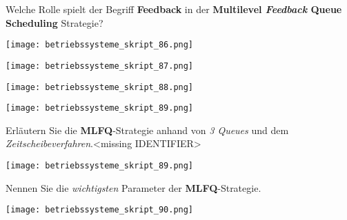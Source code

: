 \documentclass{article}
\begin{document}
\begin{tcolorbox}[colback=white!10!white,colframe=lightgray!75!black,
  savelowerto=\jobname_ex.tex,breakable,enhanced,lines before break=40]

\justifying
Welche Rolle spielt der Begriff \textbf{Feedback} in der \textbf{Multilevel \textit{Feedback} Queue Scheduling} Strategie?

\tcblower

\justifying
\begin{center}
\texttt{[image: betriebssysteme\_skript\_86.png]}
\end{center}
\begin{center}
\texttt{[image: betriebssysteme\_skript\_87.png]}
\end{center}
\begin{center}
\texttt{[image: betriebssysteme\_skript\_88.png]}
\end{center}
\begin{center}
\texttt{[image: betriebssysteme\_skript\_89.png]}
\end{center}

\end{tcolorbox}
\begin{tcolorbox}[colback=white!10!white,colframe=lightgray!75!black,
  savelowerto=\jobname_ex.tex,breakable,enhanced,lines before break=40]

\justifying
Erläutern Sie die \textbf{MLFQ}-Strategie anhand von \textit{3 Queues} und dem \textit{Zeitscheibeverfahren}.<missing IDENTIFIER>

\tcblower

\justifying
\begin{center}
\texttt{[image: betriebssysteme\_skript\_89.png]}
\end{center}

\end{tcolorbox}
\begin{tcolorbox}[colback=white!10!white,colframe=lightgray!75!black,
  savelowerto=\jobname_ex.tex,breakable,enhanced,lines before break=40]

\justifying
Nennen Sie die \textit{wichtigsten} Parameter der \textbf{MLFQ}-Strategie.

\tcblower

\justifying
\begin{center}
\texttt{[image: betriebssysteme\_skript\_90.png]}
\end{center}

\end{tcolorbox}
\end{document}
